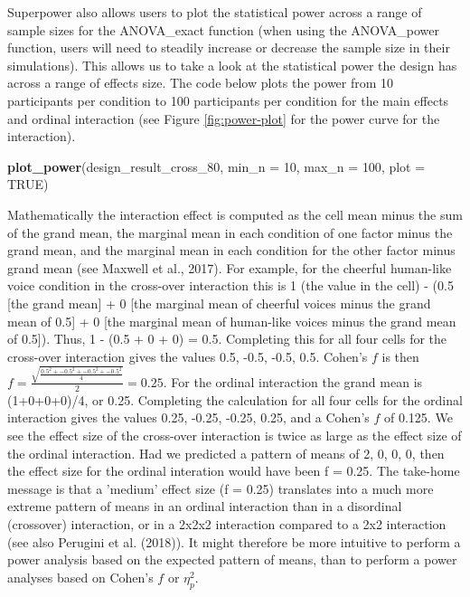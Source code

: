 \documentclass[
  ,jou,floatsintext]{apa6}
\newenvironment{Shaded}{\begin{snugshade}}{\end{snugshade}}
\newcommand{\DataTypeTok}[1]{\textcolor[rgb]{0.13,0.29,0.53}{#1}}
\newcommand{\DecValTok}[1]{\textcolor[rgb]{0.00,0.00,0.81}{#1}}
\newcommand{\KeywordTok}[1]{\textcolor[rgb]{0.13,0.29,0.53}{\textbf{#1}}}
\newcommand{\NormalTok}[1]{#1}
\newcommand{\OtherTok}[1]{\textcolor[rgb]{0.56,0.35,0.01}{#1}}
\begin{document}
Superpower also allows users to plot the statistical power across a range of sample sizes for the ANOVA\_exact function (when using the ANOVA\_power function, users will need to steadily increase or decrease the sample size in their simulations).
This allows us to take a look at the statistical power the design has across a range of effects size.
The code below plots the power from 10 participants per condition to 100 participants per condition for the main effects and ordinal interaction (see Figure \ref{fig:power-plot} for the power curve for the interaction).

\begin{Shaded}
\begin{Highlighting}[]
\KeywordTok{plot_power}\NormalTok{(design_result_cross_}\DecValTok{80}\NormalTok{, }
    \DataTypeTok{min_n =} \DecValTok{10}\NormalTok{, }\DataTypeTok{max_n =} \DecValTok{100}\NormalTok{, }\DataTypeTok{plot =} \OtherTok{TRUE}\NormalTok{)}
\end{Highlighting}
\end{Shaded}

\begin{tcolorbox}[colback=black!5!white,colframe=white!5!black,title=Box 3. Calculating effect sizes for interactions]
Mathematically the interaction effect is computed as the cell mean minus the sum of the grand mean, the marginal mean in each condition of one factor minus the grand mean, and the marginal mean in each condition for the other factor minus grand mean (see Maxwell et al., 2017). For example, for the cheerful human-like voice condition in the cross-over interaction this is 1 (the value in the cell) - (0.5 [the grand mean] + 0 [the marginal mean of cheerful voices minus the grand mean of 0.5] + 0 [the marginal mean of human-like voices minus the grand mean of 0.5]). 
Thus, 1 - (0.5 + 0 + 0) = 0.5.
Completing this for all four cells for the cross-over interaction gives the values 0.5, -0.5, -0.5, 0.5.
Cohen's $f$ is then $f = \frac { \sqrt { \frac { 0.5^2 +-0.5^2 + -0.5^2 + -0.5^2 } { 4 } }}{ 2 } = 0.25$.
For the ordinal interaction the grand mean is (1+0+0+0)/4, or 0.25.
Completing the calculation for all four cells for the ordinal interaction gives the values 0.25, -0.25, -0.25, 0.25, and a Cohen's $f$ of 0.125. 
We see the effect size of the cross-over interaction is twice as large as the effect size of the ordinal interaction. 
Had we predicted a pattern of means of 2, 0, 0, 0, then the effect size for the ordinal interation would have been f = 0.25. 
The take-home message is that a 'medium' effect size (f = 0.25) translates into a much more extreme pattern of means in an ordinal interaction than in a disordinal (crossover) interaction, or in a 2x2x2 interaction compared to a 2x2 interaction (see also Perugini et al. (2018)).
It might therefore be more intuitive to perform a power analysis based on the expected pattern of means, than to perform a power analyses based on Cohen's $f$ or $\eta_p^2$.
\end{tcolorbox}
\end{document}
